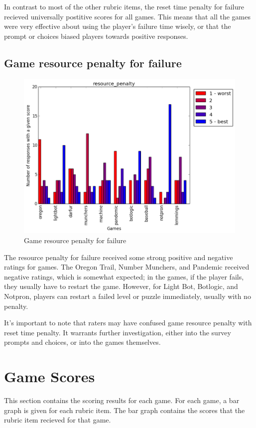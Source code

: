 				In contrast to most of the other rubric items, the reset time penalty for failure recieved universally postitive scores for all games. This means that all the games were very effective about using the player's failure time wisely, or that the prompt or choices biased players towards positive responses.

			\subsection{Game resource penalty for failure}
				\begin{figure}[] 
				\centering 
				\includegraphics[width=\textwidth, height=.4\textheight, keepaspectratio=true]{resource_penalty_scores.png} 
				\caption{Game resource penalty for failure}
				\end{figure}

				The resource penalty for failure received some strong positive and negative ratings for games. The Oregon Trail, Number Munchers, and Pandemic received negative ratings, which is somewhat expected; in the games, if the player fails, they usually have to restart the game. However, for Light Bot, Botlogic, and Notpron, players can restart a failed level or puzzle immediately, usually with no penalty.

				It's important to note that raters may have confused game resource penalty with reset time penalty. It warrants further investigation, either into the survey prompts and choices, or into the games themselves.

			\clearpage

		\section{Game Scores}
			This section contains the scoring results for each game. For each game, a bar graph is given for each rubric item. The bar graph contains the scores that the rubric item recieved for that game.


